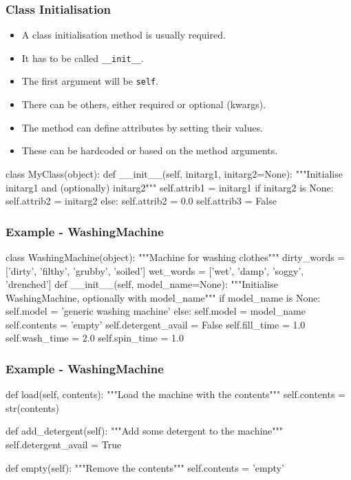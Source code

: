 \documentclass{beamer}
\begin{document}
\begin{frame}[fragile]
\frametitle{Class Initialisation}
\begin{itemize}
\item A class initialisation method is usually required.
\item It has to be called \lstinline|__init__|.
\item The first argument will be \lstinline|self|. 
\item There can be others, either required or optional (kwargs).
\item The method can define attributes by setting their values.
\item These can be hardcoded or based on the method arguments.
\end{itemize}

\begin{code}
class MyClass(object):
  def __init__(self, initarg1, initarg2=None):
    """Initialise initarg1 and (optionally) initarg2"""
    self.attrib1 = initarg1
    if initarg2 is None:
      self.attrib2 = initarg2
    else:
      self.attrib2 = 0.0
    self.attrib3 = False
\end{code}

\end{frame}

\begin{frame}[fragile]
\frametitle{Example - WashingMachine}
\begin{code}
class WashingMachine(object):
    """Machine for washing clothes"""
    dirty_words = ['dirty', 'filthy', 'grubby', 'soiled']
    wet_words = ['wet', 'damp', 'soggy', 'drenched']
    def __init__(self, model_name=None):
        """Initialise WashingMachine, optionally with model_name"""
        if model_name is None:
            self.model = 'generic washing machine'
        else:
            self.model = model_name
        self.contents = 'empty'
        self.detergent_avail = False
        self.fill_time = 1.0
        self.wash_time = 2.0
        self.spin_time = 1.0
\end{code}
\end{frame}

\begin{frame}[fragile]
\frametitle{Example - WashingMachine}
\begin{code}
    def load(self, contents):
        """Load the machine with the contents"""
        self.contents = str(contents)
        
    def add_detergent(self):
        """Add some detergent to the machine"""
        self.detergent_avail = True
        
    def empty(self):
        """Remove the contents"""
        self.contents = 'empty'
\end{code}
\end{frame}
\end{document}

